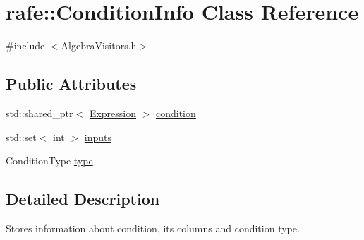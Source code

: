 \hypertarget{classrafe_1_1_condition_info}{\section{rafe\+:\+:Condition\+Info Class Reference}
\label{classrafe_1_1_condition_info}
}


{\ttfamily \#include $<$Algebra\+Visitors.\+h$>$}

\subsection*{Public Attributes}
\begin{DoxyCompactItemize}
\item 
std\+::shared\+\_\+ptr$<$ \hyperlink{classrafe_1_1_expression}{Expression} $>$ \hyperlink{classrafe_1_1_condition_info_aa64e9e78cfbd31a51647f9bdca6feb76}{condition}
\item 
std\+::set$<$ int $>$ \hyperlink{classrafe_1_1_condition_info_ab84980884b8f58e451054b22401eae41}{inputs}
\item 
Condition\+Type \hyperlink{classrafe_1_1_condition_info_a6145e30ff335f025f1a1bfa89005c1c2}{type}
\end{DoxyCompactItemize}


\subsection{Detailed Description}
Stores information about condition, its columns and condition type. 

